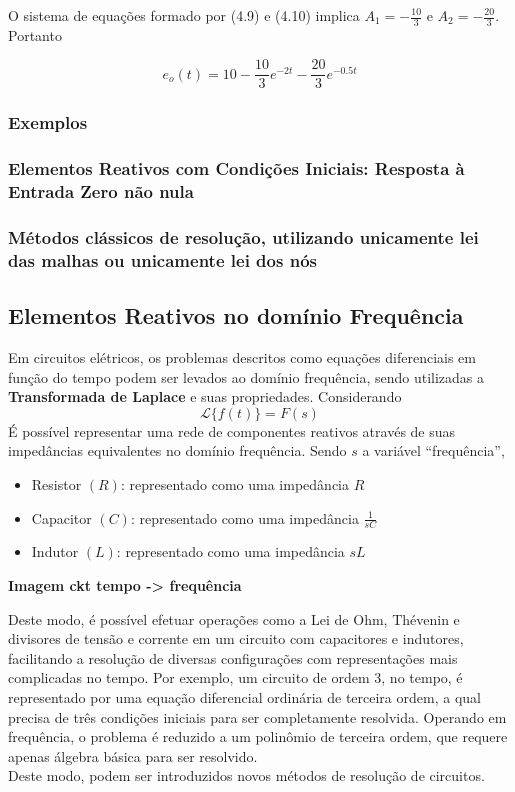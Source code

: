 \documentclass{article}
\numberwithin{equation}{section}
\begin{document}
O sistema de equações formado por (4.9) e (4.10) implica $A_{1}  = \displaystyle{-\frac{10}{3}} $ e $A_{2} = \displaystyle{-\frac{20}{3}}$. Portanto

\begin{equation*}
    e_{o}(t) = 10 - \frac{10}{3}e^{-2t} - \frac{20}{3}e^{-0.5t}
\end{equation*}

\subsubsection{Exemplos}
\label{subsubsec:exemplosreativos}

\subsubsection{Elementos Reativos com Condições Iniciais: Resposta à Entrada Zero não nula}
\label{subsubsec:entradazeronaonula}

\subsubsection{Métodos clássicos de resolução, utilizando unicamente lei das malhas ou unicamente lei dos nós}
\label{subsubsec:classicos}

\subsection{Elementos Reativos no domínio Frequência}
\label{subesc:frequencia}
Em circuitos elétricos, os problemas descritos como equações diferenciais em função do tempo podem ser levados ao domínio frequência, sendo utilizadas a \textbf{Transformada de Laplace} e suas propriedades. Considerando
$$\mathscr{L}\{f(t)\}=F(s)$$
É possível representar uma rede de componentes reativos através de suas impedâncias equivalentes no domínio frequência. Sendo $s$ a variável ``frequência'',
\begin{itemize}
    \item Resistor $(R)$: representado como uma impedância $R$
    \item Capacitor $(C)$: representado como uma impedância $\displaystyle{\frac{1}{sC}}$
    \item Indutor $(L)$: representado como uma impedância $sL$
\end{itemize}
%
\textbf{Imagem ckt tempo -> frequência}

Deste modo, é possível efetuar operações como a Lei de Ohm, Thévenin e divisores de tensão e corrente em um circuito com capacitores e indutores, facilitando a resolução de diversas configurações com representações mais complicadas no tempo. Por exemplo, um circuito de ordem 3, no tempo, é representado por uma equação diferencial ordinária de terceira ordem, a qual precisa de três condições iniciais para ser completamente resolvida. Operando em frequência, o problema é reduzido a um polinômio de terceira ordem, que requere apenas álgebra básica para ser resolvido. \\
Deste modo, podem ser introduzidos novos métodos de resolução de circuitos.
\end{document}
